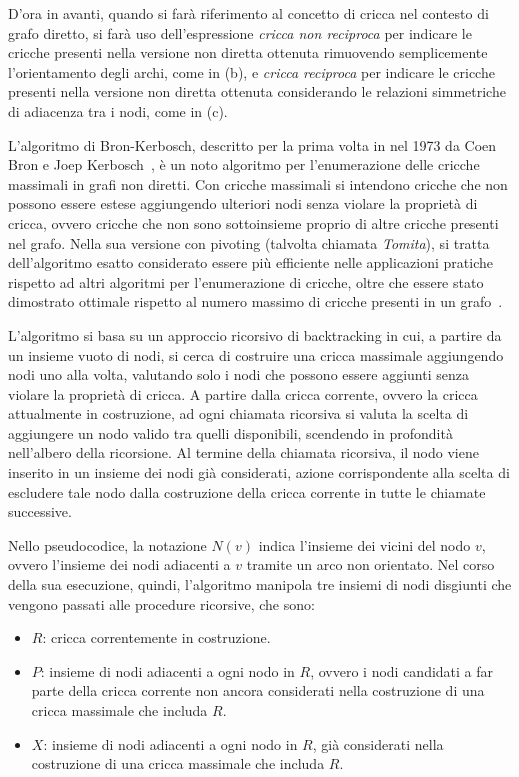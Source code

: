D'ora in avanti, quando si far\`a riferimento al concetto di cricca nel contesto di grafo diretto, si far\`a
uso dell'espressione \textit{cricca non reciproca} per indicare le cricche presenti nella versione non diretta
ottenuta rimuovendo semplicemente l'orientamento degli archi, come in (b), e \textit{cricca reciproca} per indicare
le cricche presenti nella versione non diretta ottenuta considerando le relazioni simmetriche di adiacenza tra i nodi,
come in (c).



L'algoritmo di Bron-Kerbosch, descritto per la prima volta in nel 1973 da Coen Bron e Joep Kerbosch~\cite{10.1145/362342.362367},
\`e un noto algoritmo per l'enumerazione delle cricche massimali in grafi non diretti.
Con cricche massimali si intendono cricche che non possono essere estese aggiungendo ulteriori nodi senza
violare la propriet\`a di cricca, ovvero cricche che non sono sottoinsieme proprio di altre cricche presenti nel grafo.
Nella sua versione con pivoting (talvolta chiamata \textit{Tomita}), si tratta dell'algoritmo esatto considerato essere
pi\`u efficiente nelle applicazioni pratiche rispetto ad altri algoritmi per l'enumerazione di cricche, oltre che
essere stato dimostrato ottimale rispetto al numero massimo di cricche presenti in un grafo~\cite{TOMITA200628}.
\newline

L'algoritmo si basa su un approccio ricorsivo di backtracking in cui, a partire da un insieme vuoto di nodi, si
cerca di costruire una cricca massimale aggiungendo nodi uno alla volta, valutando solo i nodi che
possono essere aggiunti senza violare la propriet\`a di cricca.
A partire dalla cricca corrente, ovvero la cricca attualmente in costruzione, ad ogni chiamata ricorsiva si valuta
la scelta di aggiungere un nodo valido tra quelli disponibili, scendendo in profondit\`a nell'albero della ricorsione.
Al termine della chiamata ricorsiva, il nodo viene inserito in un insieme dei nodi
gi\`a considerati, azione corrispondente alla scelta di escludere tale nodo dalla costruzione della cricca corrente in tutte
le chiamate successive. \newline



Nello pseudocodice, la notazione $N(v)$ indica l'insieme dei vicini del nodo $v$, ovvero l'insieme dei nodi adiacenti
a $v$ tramite un arco non orientato.
Nel corso della sua esecuzione, quindi, l'algoritmo manipola tre insiemi di nodi disgiunti che vengono passati
alle procedure ricorsive, che sono:
\begin{itemize}
    \item $R$: cricca correntemente in costruzione.
    \item $P$: insieme di nodi adiacenti a ogni nodo in $R$, ovvero i nodi candidati a far parte della cricca corrente
    non ancora considerati nella costruzione di una cricca massimale che includa $R$.
    \item $X$: insieme di nodi adiacenti a ogni nodo in $R$, gi\`a considerati nella costruzione di una cricca
    massimale che includa $R$.
\end{itemize}

